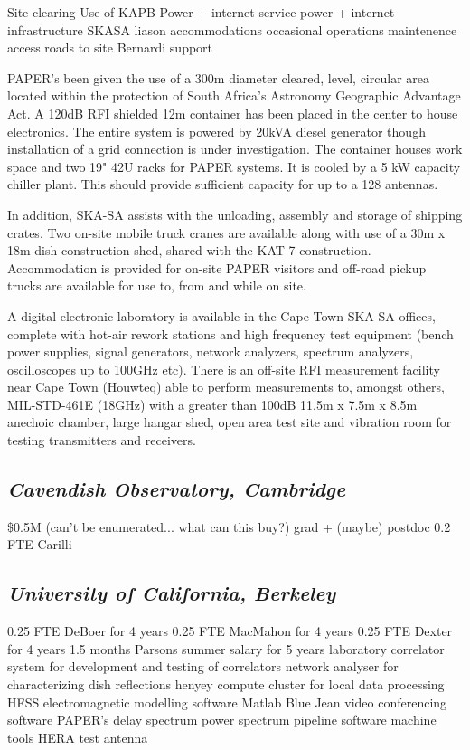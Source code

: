 \documentclass[11pt]{article}
\begin{document}
Site clearing
Use of KAPB
Power + internet service
power + internet infrastructure
SKASA liason
accommodations
occasional operations maintenence
access roads to site
Bernardi support


PAPER’s been given the use of a 300m diameter cleared, level, circular area
located within the protection of South Africa’s Astronomy Geographic Advantage
Act. A 120dB RFI shielded 12m container has been placed in the center to house
electronics. The entire system is powered by 20kVA diesel generator though
installation of a grid connection is under investigation. The container houses
work space and two 19" 42U racks for PAPER systems. It is cooled by a 5 kW
capacity chiller plant. This should provide sufficient capacity for up to a 128
antennas.

In addition, SKA-SA assists with the unloading, assembly and storage of
shipping crates. Two on-site mobile truck cranes are available along with use
of a 30m x 18m dish construction shed, shared with the KAT-7 construction.
Accommodation is provided for on-site PAPER visitors and off-road pickup trucks
are available for use to, from and while on site.

A digital electronic laboratory is available in the Cape Town SKA-SA offices,
complete with hot-air rework stations and high frequency test equipment
(bench power supplies, signal generators, network analyzers, spectrum
analyzers, oscilloscopes up to 100GHz etc). There is an off-site RFI
measurement facility near Cape Town (Houwteq) able to perform measurements to,
amongst others, MIL-STD-461E (18GHz) with a greater than 100dB 11.5m x 7.5m x
8.5m anechoic chamber, large hangar shed, open area test site and vibration
room for testing transmitters and receivers.

\subsection*{\it Cavendish Observatory, Cambridge}

\$0.5M (can't be enumerated... what can this buy?)
grad + (maybe) postdoc
0.2 FTE Carilli

\subsection*{\it University of California, Berkeley}

0.25 FTE DeBoer for 4 years
0.25 FTE MacMahon for 4 years
0.25 FTE Dexter for 4 years
1.5 months Parsons summer salary for 5 years
laboratory correlator system for development and testing of correlators
network analyser for characterizing dish reflections
henyey compute cluster for local data processing
HFSS electromagnetic modelling software
Matlab
Blue Jean video conferencing software
PAPER's delay spectrum power spectrum pipeline software
machine tools
HERA test antenna
\end{document}
